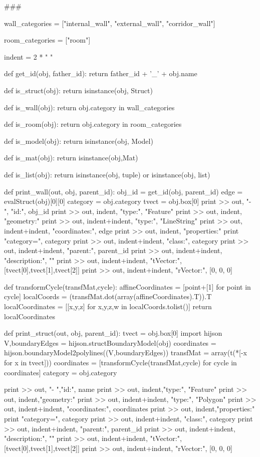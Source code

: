 \documentclass[11pt,oneside]{article}	%
\begin{document}
{###

wall_categories = ["internal_wall", "external_wall", "corridor_wall"]

room_categories = ["room"]

indent = 2 * " "

def get_id(obj, father_id):
	return father_id + '_' + obj.name

def is_struct(obj):
	return isinstance(obj, Struct)
   
def is_wall(obj):
	return obj.category in wall_categories

def is_room(obj):
	return obj.category in room_categories

def is_model(obj):
	return isinstance(obj, Model)

def is_mat(obj):
	return isinstance(obj,Mat)

def is_list(obj):
	return isinstance(obj, tuple) or isinstance(obj, list)

def print_wall(out, obj, parent_id):
	obj_id = get_id(obj, parent_id)
	edge = evalStruct(obj)[0][0]
	category = obj.category
	tvect = obj.box[0]
	print >> out, "-   ", "id:", obj_id
	print >> out, indent, "type:", "Feature"
	print >> out, indent, "geometry:" 
	print >> out, indent+indent, "type:", "LineString"
	print >> out, indent+indent, "coordinates:", edge
	print >> out, indent, "properties:"
	print "category=", category
	print >> out, indent+indent, "class:", category
	print >> out, indent+indent, "parent:", parent_id
	print >> out, indent+indent, "description:", ""
	print >> out, indent+indent, "tVector:", [tvect[0],tvect[1],tvect[2]]
	print >> out, indent+indent, "rVector:", [0, 0, 0]  


def transformCycle(transfMat,cycle):
	affineCoordinates = [point+[1] for point in cycle]
	localCoords = (transfMat.dot(array(affineCoordinates).T)).T
	localCoordinates = [[x,y,z] for x,y,z,w in localCoords.tolist()]
	return localCoordinates

def print_struct(out, obj, parent_id):
	tvect = obj.box[0]
	import hijson
	V,boundaryEdges = hijson.structBoundaryModel(obj)   
	coordinates = hijson.boundaryModel2polylines((V,boundaryEdges))
	transfMat = array(t(*[-x for x in tvect]))   
	coordinates = [transformCycle(transfMat,cycle) for cycle in coordinates]
	category = obj.category
	
	print >> out, "-   ","id:", name
	print >> out, indent,"type:", "Feature"
	print >> out, indent,"geometry:" 
	print >> out, indent+indent, "type:", "Polygon"
	print >> out, indent+indent, "coordinates:", coordinates
	print >> out, indent,"properties:"
	print "category=", category
	print >> out, indent+indent, "class:", category
	print >> out, indent+indent, "parent:", parent_id
	print >> out, indent+indent, "description:", ""
	print >> out, indent+indent, "tVector:", [tvect[0],tvect[1],tvect[2]]
	print >> out, indent+indent, "rVector:", [0, 0, 0]

}
\end{document}
